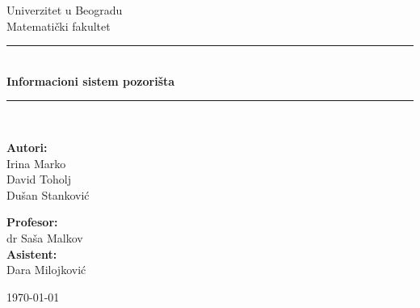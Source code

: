 \documentclass{article}
\date{}
\begin{document}

\begin{titlepage}
    \centering
    {\LARGE Univerzitet u Beogradu}\\[0.5cm]
    {\LARGE Matematički fakultet}\\[2.5cm]
    
    \rule{\linewidth}{0.5mm} \\[0.4cm]
    {\Huge \textbf{Informacioni sistem pozorišta}} \\[0.2cm]
    \rule{\linewidth}{0.5mm} \\[3cm]
    
    \noindent
    \begin{minipage}{0.4\textwidth}
        \begin{flushleft} \large
            \textbf{Autori:}\\
            Irina Marko\\
            David Toholj\\
            Dušan Stanković
        \end{flushleft}
    \end{minipage}%
    \hfill
    \begin{minipage}{0.4\textwidth}
        \begin{flushright} \large
            \textbf{Profesor:} \\
            dr Saša Malkov\\[0.5cm]
            \textbf{Asistent:} \\
            Dara Milojković
        \end{flushright}
    \end{minipage}
    
    \vfill
    
    {\Large \today}
    
\end{titlepage}

\tableofcontents

\newpage














\end{document}
